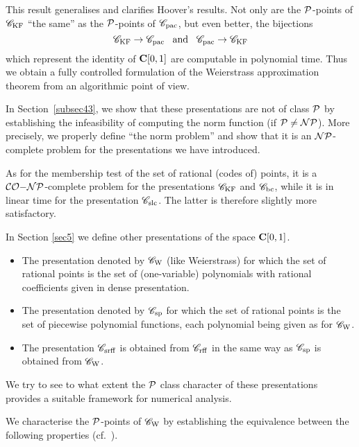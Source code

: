 This result generalises and clarifies Hoover's results. Not only are the ${\cal P}$-points of ${{{\mathscr C}}_{\rm KF}}$ ``the same'' as the ${\cal P}$-points of ${{{\mathscr C}}_{\rm pac}}$, but even better, the bijections 
\[
{{{\mathscr C}}_{\rm KF}} \rightarrow {{{\mathscr C}}_{\rm pac}} \;\; \; {\rm and} \; \; \; {{{\mathscr C}}_{\rm pac}} \rightarrow {{{\mathscr C}}_{\rm KF}}
\]
which represent the identity of ${{\bf C}[0,1]}$ are computable in polynomial time. 
Thus we obtain a fully controlled formulation of the Weierstrass approximation theorem from an algorithmic point of view. 

\smallskip In Section~\ref{subsec43}, we show that these presentations are not of class ${\cal P}$ by establishing the infeasibility of computing the norm function (if ${\cal P}\neq {\cal NP}$). 
More precisely, we properly define ``the norm problem'' and show that it is an ${\cal NP}$-complete problem for the  presentations we have introduced. 

As for the membership test of the set of rational (codes of) points, it is a ${\cal CO}{\rm-}{\cal NP}$-complete problem for the presentations ${{{\mathscr C}}_{\rm KF}}$ and ${{{\mathscr C}}_{\rm bc}}$, while it is in linear time for the presentation ${{{\mathscr C}}_{\rm slc}}$. The latter is therefore slightly more satisfactory.

\medskip In Section \ref{sec5} we define other presentations of the space ${{\bf C}[0,1]}$.
\begin{itemize}

\item 
The presentation denoted by ${{{\mathscr C}}_{\rm W}}$ (like Weierstrass) for which the set of rational points is the set of (one-variable) polynomials with rational coefficients given in dense presentation.

\item 
The presentation denoted by ${{{\mathscr C}}_{\rm sp}}$ for which the set of rational points is the set of piecewise polynomial functions, each polynomial being given as for ${{{\mathscr C}}_{\rm W}}$.

\item 
The presentation ${{{\mathscr C}}_{\rm srff}}$ is obtained from ${{{\mathscr C}}_{\rm rff}}$ in the same way as ${{{\mathscr C}}_{\rm sp}}$ is obtained from ${{{\mathscr C}}_{\rm W}}$.
\end{itemize}
We try to see to what extent the ${\cal P}$ class character of these presentations provides a suitable framework for numerical analysis.

We characterise the ${\cal P}$-points of ${{{\mathscr C}}_{\rm W}}$ by establishing the equivalence between the following properties (cf.\ ).

